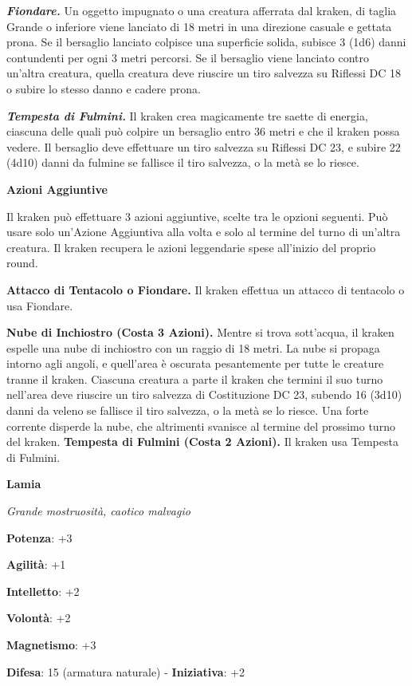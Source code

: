\begin{multicols}{2}
\emph{\textbf{Fiondare.}} Un oggetto impugnato o una creatura afferrata
dal kraken, di taglia Grande o inferiore viene lanciato di 18 metri in
una direzione casuale e gettata prona. Se il bersaglio lanciato colpisce
una superficie solida, subisce 3 (1d6) danni contundenti per ogni 3
metri percorsi. Se il bersaglio viene lanciato contro un'altra creatura,
quella creatura deve riuscire un tiro salvezza su Riflessi DC 18 o
subire lo stesso danno e cadere prona.

\emph{\textbf{Tempesta di Fulmini.}} Il kraken crea magicamente tre
saette di energia, ciascuna delle quali può colpire un bersaglio entro
36 metri e che il kraken possa vedere. Il bersaglio deve effettuare un
tiro salvezza su Riflessi DC 23, e subire 22 (4d10) danni da fulmine se
fallisce il tiro salvezza, o la metà se lo riesce.

\textbf{Azioni Aggiuntive}

Il kraken può effettuare 3 azioni aggiuntive, scelte tra le opzioni
seguenti. Può usare solo un'Azione Aggiuntiva alla volta e solo al
termine del turno di un'altra creatura. Il kraken recupera le azioni
leggendarie spese all'inizio del proprio round.

\textbf{Attacco di Tentacolo o Fiondare.} Il kraken effettua un attacco
di tentacolo o usa Fiondare.

\textbf{Nube di Inchiostro (Costa 3 Azioni).} Mentre si trova
sott'acqua, il kraken espelle una nube di inchiostro con un raggio di 18
metri. La nube si propaga intorno agli angoli, e quell'area è oscurata
pesantemente per tutte le creature tranne il kraken. Ciascuna creatura a
parte il kraken che termini il suo turno nell'area deve riuscire un tiro
salvezza di Costituzione DC 23, subendo 16 (3d10) danni da veleno se
fallisce il tiro salvezza, o la metà se lo riesce. Una forte corrente
disperde la nube, che altrimenti svanisce al termine del prossimo turno
del kraken. \textbf{Tempesta di Fulmini (Costa 2 Azioni).} Il kraken usa
Tempesta di Fulmini.



\textbf{Lamia}

\emph{Grande mostruosità, caotico malvagio}

\textbf{Potenza}: +3

\textbf{Agilità}: +1

\textbf{Intelletto}: +2

\textbf{Volontà}: +2

\textbf{Magnetismo}: +3

\textbf{Difesa}: 15 (armatura naturale) - \textbf{Iniziativa}: +2


\end{multicols}
